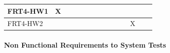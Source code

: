 \documentclass[12pt, titlepage]{article}
\begin{document}
\begin{table}[ht]
{\begin{tabular}{llllllllllllll}
\multicolumn{1}{|l|}{FRT4-HW1}   & \multicolumn{1}{l|}{X} & \multicolumn{1}{l|}{}  & \multicolumn{1}{l|}{}  & \multicolumn{1}{l|}{}  & \multicolumn{1}{l|}{}  & \multicolumn{1}{l|}{}  & \multicolumn{1}{l|}{}  & \multicolumn{1}{l|}{}  & \multicolumn{1}{l|}{}  & \multicolumn{1}{l|}{}   & \multicolumn{1}{l|}{}   & \multicolumn{1}{l|}{}   & \multicolumn{1}{l|}{}   \\ \hline
\multicolumn{1}{|l|}{FRT4-HW2}   & \multicolumn{1}{l|}{}  & \multicolumn{1}{l|}{}  & \multicolumn{1}{l|}{}  & \multicolumn{1}{l|}{}  & \multicolumn{1}{l|}{}  & \multicolumn{1}{l|}{}  & \multicolumn{1}{l|}{}  & \multicolumn{1}{l|}{}  & \multicolumn{1}{l|}{}  & \multicolumn{1}{l|}{}   & \multicolumn{1}{l|}{X}  & \multicolumn{1}{l|}{}   & \multicolumn{1}{l|}{}   \\ \hline
\end{tabular}}
\end{table}

\paragraph{Non Functional Requirements to System Tests}
\end{document}
